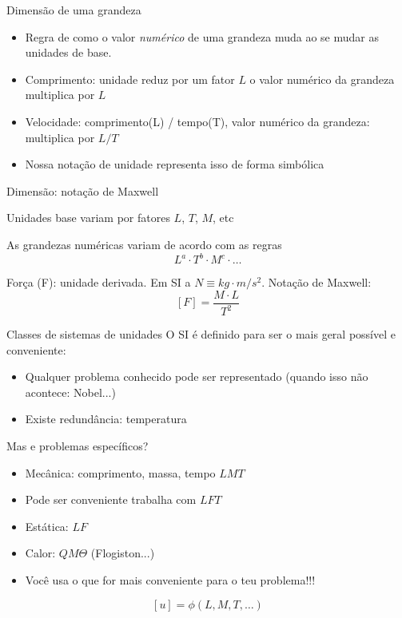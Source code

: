 \documentclass{beamer}
\begin{document}
\begin{frame}{Dimensão de uma grandeza}
  \begin{itemize}
    \item Regra de como o valor \emph{numérico} de uma grandeza muda ao se mudar as unidades de base.
    \item Comprimento: unidade reduz por um fator $L$ o valor numérico da grandeza multiplica por $L$
    \item Velocidade: comprimento(L) / tempo(T), valor numérico da grandeza: multiplica por $L/T$
    \item Nossa notação de unidade representa isso de  forma simbólica
\end{itemize}
\end{frame}

\begin{frame}{Dimensão: notação de Maxwell}
    
  Unidades base variam por fatores $L$, $T$, $M$, etc

  As grandezas numéricas variam de acordo com as regras
  \[
  L^a \cdot T^b \cdot M^c\cdot\ldots
  \]

  Força (F): unidade derivada. Em SI a  $N\equiv kg\cdot m / s^2$. Notação de Maxwell:
  \[
  [F] = \frac{M \cdot L}{T^2}
  \]
  
\end{frame}


\begin{frame}{Classes de sistemas de unidades}
  O SI é definido para ser o mais geral possível e conveniente:
  \begin{itemize}
  \item Qualquer problema conhecido pode ser representado (quando isso não acontece: Nobel...)
  \item Existe redundância: temperatura
  \end{itemize}

  Mas e problemas específicos?
  \begin{itemize}
  \item Mecânica: comprimento, massa, tempo $LMT$
  \item Pode ser conveniente trabalha com $LFT$
  \item Estática: $LF$
  \item Calor: $QM\Theta$ (Flogiston...)
  \item Você usa o que for mais conveniente para o teu problema!!!
  \end{itemize}

  \[
    [u] = \phi(L,M,T,\ldots)
    \]
    
  
\end{frame}
\end{document}
